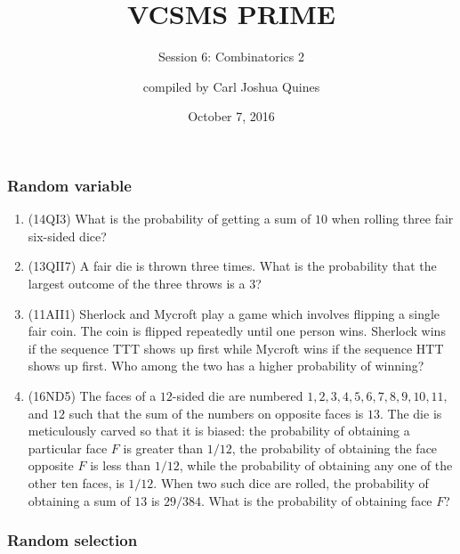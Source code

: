 \documentclass[10pt,paper=letter]{scrartcl}
\begin{document}
\title{VCSMS PRIME}
\subtitle{Session 6: Combinatorics 2}
\author{compiled by Carl Joshua Quines}
\date{October 7, 2016}

\maketitle

\subsubsection*{Random variable}

\begin{enumerate}

\item (14QI3) What is the probability of getting a sum of $10$ when rolling three fair six-sided dice?

\item (13QII7) A fair die is thrown three times. What is the probability that the largest outcome of the three throws is a $3$?

\item (11AII1) Sherlock and Mycroft play a game which involves flipping a single fair coin. The coin is flipped repeatedly until one person wins. Sherlock wins if the sequence TTT shows up first while Mycroft wins if the sequence HTT shows up first. Who among the two has a higher probability of winning?

\item (16ND5) The faces of a $12$-sided die are numbered $1, 2, 3, 4, 5, 6, 7, 8, 9, 10, 11,$ and $12$ such that the sum of the numbers on opposite faces is $13$. The die is meticulously carved so that it is biased: the probability of obtaining a particular face $F$ is greater than $1/12$, the probability of obtaining the face opposite $F$ is less than $1/12$, while the probability of obtaining any one of the other ten faces, is $1/12$. When two such dice are rolled, the probability of obtaining a sum of $13$ is $29/384$. What is the probability of obtaining face $F$?

\end{enumerate}

\subsubsection*{Random selection}
\end{document}

